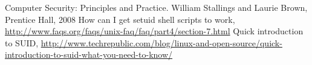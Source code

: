 \documentclass[a4paper,11pt]{article}
\begin{document}
\begin{thebibliography}{---}
 Computer Security: Principles and Practice. William Stallings and Laurie Brown, Prentice Hall, 2008
 How can I get setuid shell scripts to work, \url{http://www.faqs.org/faqs/unix-faq/faq/part4/section-7.html} 
 Quick introduction to SUID, \url{http://www.techrepublic.com/blog/linux-and-open-source/quick-introduction-to-suid-what-you-need-to-know/}
\end{thebibliography}
\end{document}

